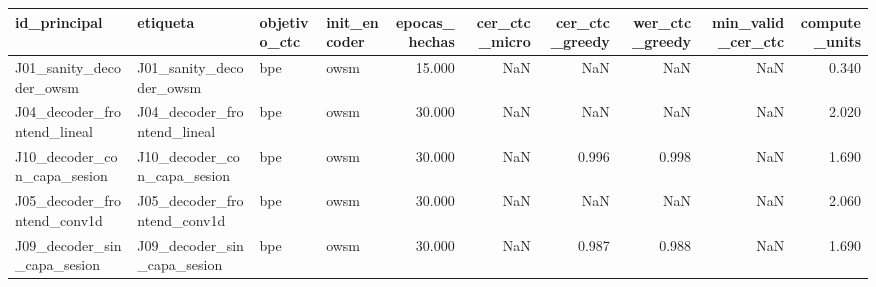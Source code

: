 \begin{tabular}{llllrrrrrr}
\toprule
id_principal & etiqueta & objetivo_ctc & init_encoder & epocas_hechas & cer_ctc_micro & cer_ctc_greedy & wer_ctc_greedy & min_valid_cer_ctc & compute_units \\
\midrule
J01_sanity_decoder_owsm & J01_sanity_decoder_owsm & bpe & owsm & 15.000 & NaN & NaN & NaN & NaN & 0.340 \\
J04_decoder_frontend_lineal & J04_decoder_frontend_lineal & bpe & owsm & 30.000 & NaN & NaN & NaN & NaN & 2.020 \\
J10_decoder_con_capa_sesion & J10_decoder_con_capa_sesion & bpe & owsm & 30.000 & NaN & 0.996 & 0.998 & NaN & 1.690 \\
J05_decoder_frontend_conv1d & J05_decoder_frontend_conv1d & bpe & owsm & 30.000 & NaN & NaN & NaN & NaN & 2.060 \\
J09_decoder_sin_capa_sesion & J09_decoder_sin_capa_sesion & bpe & owsm & 30.000 & NaN & 0.987 & 0.988 & NaN & 1.690 \\
\bottomrule
\end{tabular}
